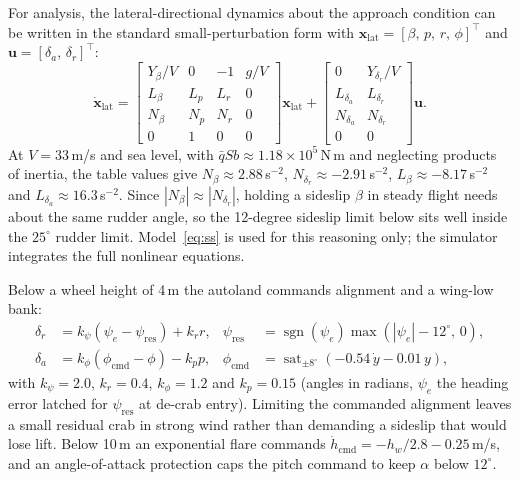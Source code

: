 \documentclass[10pt,a4paper]{article}
\begin{document}
For analysis, the lateral-directional dynamics about the approach condition can be
written in the standard small-perturbation form with
\(\mathbf{x}_{\mathrm{lat}}=[\beta,\,p,\,r,\,\phi]^\top\) and
\(\mathbf{u}=[\delta_a,\,\delta_r]^\top\):
\begin{equation}
\dot{\mathbf{x}}_{\mathrm{lat}}=
\begin{bmatrix}
Y_\beta/V & 0 & -1 & g/V\\
L_\beta & L_p & L_r & 0\\
N_\beta & N_p & N_r & 0\\
0 & 1 & 0 & 0
\end{bmatrix}\mathbf{x}_{\mathrm{lat}}+
\begin{bmatrix}
0 & Y_{\delta_r}/V\\
L_{\delta_a} & L_{\delta_r}\\
N_{\delta_a} & N_{\delta_r}\\
0 & 0
\end{bmatrix}\mathbf{u}.
\label{eq:ss}
\end{equation}
At \(V=33\)\,m/s and sea level, with \(\bar{q}Sb\approx1.18\times10^{5}\)\,N\,m and
neglecting products of inertia, the table values give
\(N_\beta\approx2.88\)\,s\(^{-2}\), \(N_{\delta_r}\approx-2.91\)\,s\(^{-2}\),
\(L_\beta\approx-8.17\)\,s\(^{-2}\) and \(L_{\delta_a}\approx16.3\)\,s\(^{-2}\).
Since \(|N_\beta|\approx|N_{\delta_r}|\), holding a sideslip \(\beta\) in steady
flight needs about the same rudder angle, so the 12-degree sideslip limit below sits
well inside the \(25^\circ\) rudder limit. Model~\eqref{eq:ss} is used for this
reasoning only; the simulator integrates the full nonlinear equations.

Below a wheel height of 4\,m the autoland commands alignment and a wing-low bank:
\begin{align}
\delta_r &= k_\psi(\psi_e-\psi_{\mathrm{res}})+k_r r, &
\psi_{\mathrm{res}} &= \operatorname{sgn}(\psi_e)\max\left(|\psi_e|-12^\circ,\,0\right),\label{eq:decrab}\\
\delta_a &= k_\phi(\phi_{\mathrm{cmd}}-\phi)-k_p p, &
\phi_{\mathrm{cmd}} &= \operatorname{sat}_{\pm8^\circ}\left(-0.54\,\dot{y}-0.01\,y\right),\label{eq:winglow}
\end{align}
with \(k_\psi=2.0\), \(k_r=0.4\), \(k_\phi=1.2\) and \(k_p=0.15\) (angles in radians,
\(\psi_e\) the heading error latched for \(\psi_{\mathrm{res}}\) at de-crab entry).
Limiting the commanded alignment leaves a small residual crab in strong wind rather
than demanding a sideslip that would lose lift. Below 10\,m an exponential flare
commands \(\dot{h}_{\mathrm{cmd}}=-h_w/2.8-0.25\)\,m/s, and an angle-of-attack
protection caps the pitch command to keep \(\alpha\) below \(12^\circ\).
\end{document}
